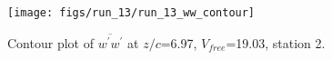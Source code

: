 \begin{figure}[H]
\centering
\texttt{[image: figs/run\_13/run\_13\_ww\_contour]}
\caption{Contour plot of $\overline{w^\prime w^\prime}$ at $z/c$=6.97, $V_{free}$=19.03, station 2.}
\label{fig:run_13_ww_contour}
\end{figure}


